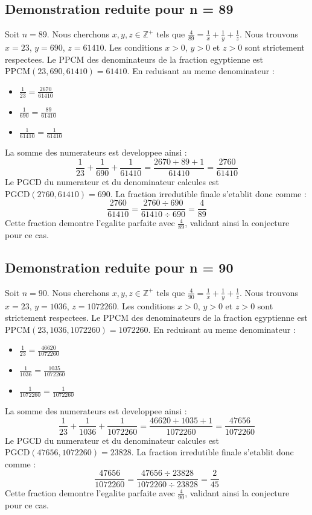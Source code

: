 \documentclass[11pt,a4paper]{article}
\begin{document}
\subsection{Demonstration reduite pour n = 89}
Soit $n = 89$. Nous cherchons $x, y, z \in \mathbb{Z}^{+}$ tels que $\frac{4}{89} = \frac{1}{x} + \frac{1}{y} + \frac{1}{z}$.
Nous trouvons $x = 23$, $y = 690$, $z = 61410$.
Les conditions $x > 0$, $y > 0$ et $z > 0$ sont strictement respectees.
Le PPCM des denominateurs de la fraction egyptienne est $\text{PPCM}(23, 690, 61410) = 61410$.
En reduisant au meme denominateur :
\begin{itemize}
    \item $\frac{1}{23} = \frac{2670}{61410}$
    \item $\frac{1}{690} = \frac{89}{61410}$
    \item $\frac{1}{61410} = \frac{1}{61410}$
\end{itemize}
La somme des numerateurs est developpee ainsi :
$$ \frac{1}{23} + \frac{1}{690} + \frac{1}{61410} = \frac{2670 + 89 + 1}{61410} = \frac{2760}{61410} $$
Le PGCD du numerateur et du denominateur calcules est $\text{PGCD}(2760, 61410) = 690$.
La fraction irredutible finale s'etablit donc comme :
$$ \frac{2760}{61410} = \frac{2760 \div 690}{61410 \div 690} = \frac{4}{89} $$
Cette fraction demontre l'egalite parfaite avec $\frac{4}{89}$, validant ainsi la conjecture pour ce cas.

\subsection{Demonstration reduite pour n = 90}
Soit $n = 90$. Nous cherchons $x, y, z \in \mathbb{Z}^{+}$ tels que $\frac{4}{90} = \frac{1}{x} + \frac{1}{y} + \frac{1}{z}$.
Nous trouvons $x = 23$, $y = 1036$, $z = 1072260$.
Les conditions $x > 0$, $y > 0$ et $z > 0$ sont strictement respectees.
Le PPCM des denominateurs de la fraction egyptienne est $\text{PPCM}(23, 1036, 1072260) = 1072260$.
En reduisant au meme denominateur :
\begin{itemize}
    \item $\frac{1}{23} = \frac{46620}{1072260}$
    \item $\frac{1}{1036} = \frac{1035}{1072260}$
    \item $\frac{1}{1072260} = \frac{1}{1072260}$
\end{itemize}
La somme des numerateurs est developpee ainsi :
$$ \frac{1}{23} + \frac{1}{1036} + \frac{1}{1072260} = \frac{46620 + 1035 + 1}{1072260} = \frac{47656}{1072260} $$
Le PGCD du numerateur et du denominateur calcules est $\text{PGCD}(47656, 1072260) = 23828$.
La fraction irredutible finale s'etablit donc comme :
$$ \frac{47656}{1072260} = \frac{47656 \div 23828}{1072260 \div 23828} = \frac{2}{45} $$
Cette fraction demontre l'egalite parfaite avec $\frac{4}{90}$, validant ainsi la conjecture pour ce cas.
\end{document}
